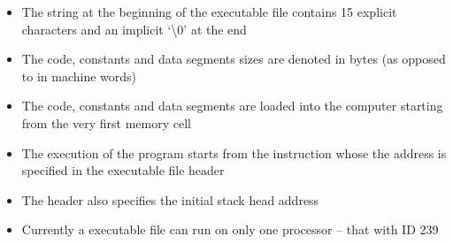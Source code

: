 \begin{itemize}
    \item The  string at the beginning of the executable file contains 15 explicit characters and an implicit `\textbackslash 0' at the end
    \item The code, constants and data segments sizes are denoted in bytes (as opposed to in machine words)
    \item The code, constants and data segments are loaded into the  computer starting from the very first memory cell
    \item The execution of the program starts from the instruction whose the address is specified in the executable file header
    \item The header also specifies the initial stack head address
    \item Currently a  executable file can run on only one processor -- that with ID 239
\end{itemize}
